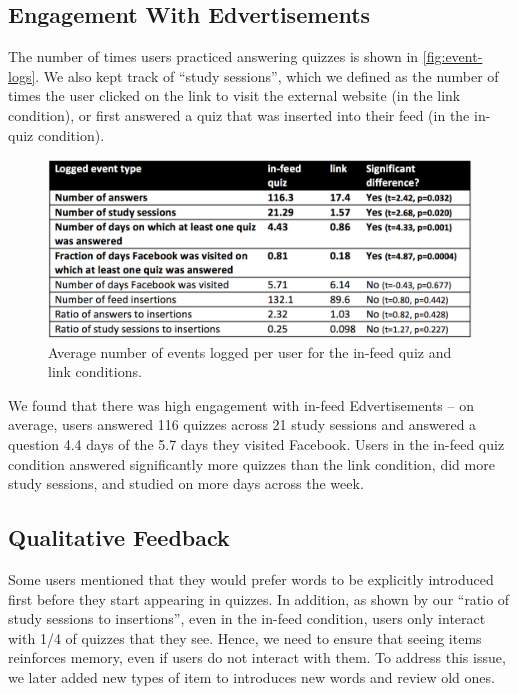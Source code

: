 \documentclass{sigchi}
\begin{document}
\subsection{Engagement With Edvertisements}

The number of times users practiced answering quizzes is shown in \autoref{fig:event-logs}. We also kept track of ``study sessions'', which we defined as the number of times the user clicked on the link to visit the external website (in the link condition), or first answered a quiz that was inserted into their feed (in the in-quiz condition). %

\begin{figure}
\centering
\includegraphics[width=1.0\columnwidth]{event-logs-feedlearn}
\caption{Average number of events logged per user for the in-feed quiz and link conditions.}
\label{fig:event-logs}
\end{figure}

We found that there was high engagement with in-feed Edvertisements -- on average, users answered 116 quizzes across 21 study sessions and answered a question 4.4 days of the 5.7 days they visited Facebook. Users in the in-feed quiz condition answered significantly more quizzes than the link condition, did more study sessions, and studied on more days across the week. %

\subsection{Qualitative Feedback}

Some users mentioned that they would prefer words to be explicitly introduced first before they start appearing in quizzes.  In addition, as shown by our ``ratio of study sessions to insertions'', even in the in-feed condition, users only interact with 1/4 of quizzes that they see. Hence, we need to ensure that seeing items reinforces memory, even if users do not interact with them. To address this issue, we later added new types of item to introduces new words and review old ones.
\end{document}
